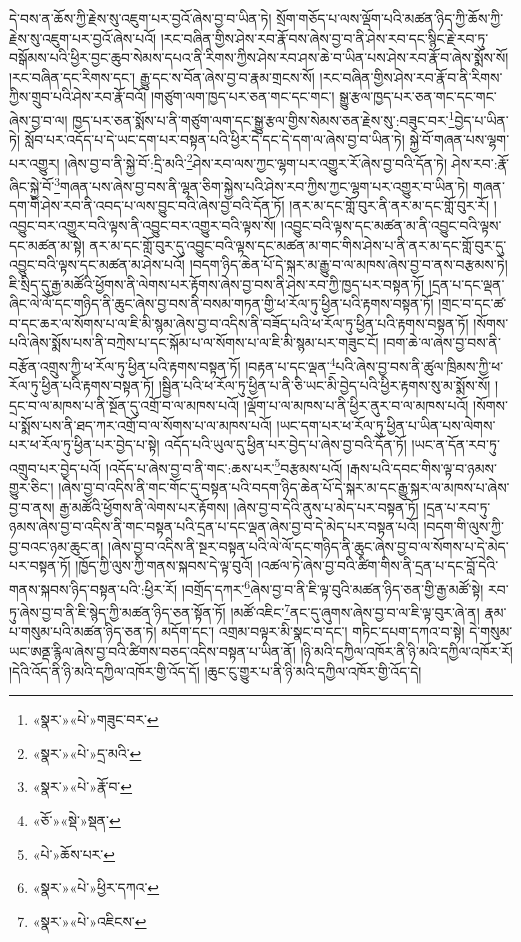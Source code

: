 དེ་བས་ན་ཆོས་ཀྱི་རྗེས་སུ་འཇུག་པར་བྱའོ་ཞེས་བྱ་བ་ཡིན་ཏེ། སྲོག་གཅོད་པ་ལས་ལྡོག་པའི་མཚན་ཉིད་ཀྱི་ཆོས་ཀྱི་རྗེས་སུ་འཇུག་པར་བྱའོ་ཞེས་པའོ། །རང་བཞིན་གྱིས་ཤེས་རབ་རྣོ་བས་ཞེས་བྱ་བ་ནི་ཤེས་རབ་དང་སྙིང་རྗེ་རབ་ཏུ་བསྒོམས་པའི་ཕྱིར་བྱང་ཆུབ་སེམས་དཔའ་ནི་རིགས་ཀྱིས་ཤེས་རབ་ཤས་ཆེ་བ་ཡིན་པས་ཤེས་རབ་རྣོ་བ་ཞེས་སྨོས་སོ། །རང་བཞིན་དང་རིགས་དང་། རྒྱུ་དང་ས་བོན་ཞེས་བྱ་བ་རྣམ་གྲངས་སོ། །རང་བཞིན་གྱིས་ཤེས་རབ་རྣོ་བ་ནི་རིགས་ཀྱིས་གྲུབ་པའི་ཤེས་རབ་རྣོ་བའོ། །གཙུག་ལག་ཁྱད་པར་ཅན་གང་དང་གང་། སྒྱུ་རྩལ་ཁྱད་པར་ཅན་གང་དང་གང་ཞེས་བྱ་བ་ལ། ཁྱད་པར་ཅན་སྨོས་པ་ནི་གཙུག་ལག་དང་སྒྱུ་རྩལ་གྱིས་སེམས་ཅན་རྗེས་སུ་:བཟུང་བར་\footnote{«སྣར་»«པེ་»གཟུང་བར་}བྱེད་པ་ཡིན་ཏེ། སློབ་པར་འདོད་པ་དེ་ཡང་དག་པར་བསྟན་པའི་ཕྱིར་དེ་དང་དེ་དག་ལ་ཞེས་བྱ་བ་ཡིན་ཏེ། སྐྱེ་བོ་གཞན་པས་ལྷག་པར་འགྱུར། །ཞེས་བྱ་བ་ནི་སྐྱེ་བོ་:དྲི་མའི་\footnote{«སྣར་»«པེ་»དྲ་མའི་}ཤེས་རབ་ལས་ཀྱང་ལྷག་པར་འགྱུར་རོ་ཞེས་བྱ་བའི་དོན་ཏེ། ཤེས་རབ་:རྣོ་ཞིང་སྐྱེ་བོ་\footnote{«སྣར་»«པེ་»རྣོ་བ་}གཞན་པས་ཞེས་བྱ་བས་ནི་ལྷན་ཅིག་སྐྱེས་པའི་ཤེས་རབ་ཀྱིས་ཀྱང་ལྷག་པར་འགྱུར་བ་ཡིན་ཏེ། གཞན་དག་གི་ཤེས་རབ་ནི་འབད་པ་ལས་བྱུང་བའི་ཞེས་བྱ་བའི་དོན་ཏོ། །ནར་མ་དང་གློ་བུར་ནི་ནར་མ་དང་གློ་བུར་རོ། །འབྱུང་བར་འགྱུར་བའི་ལྟས་ནི་འབྱུང་བར་འགྱུར་བའི་ལྟས་སོ། །འབྱུང་བའི་ལྟས་དང་མཚན་མ་ནི་འབྱུང་བའི་ལྟས་དང་མཚན་མ་སྟེ། ནར་མ་དང་གློ་བུར་དུ་འབྱུང་བའི་ལྟས་དང་མཚན་མ་གང་གིས་ཤེས་པ་ནི་ནར་མ་དང་གློ་བུར་དུ་འབྱུང་བའི་ལྟས་དང་མཚན་མ་ཤེས་པའོ། །བདག་ཉིད་ཆེན་པོ་དེ་སྐར་མ་རྒྱུ་བ་ལ་མཁས་ཞེས་བྱ་བ་ནས་བརྩམས་ཏེ། ཇི་སྲིད་དུ་རྒྱ་མཚོའི་ཕྱོགས་ནི་ལེགས་པར་རྟོགས་ཞེས་བྱ་བས་ནི་ཤེས་རབ་ཀྱི་ཁྱད་པར་བསྟན་ཏོ། །དྲན་པ་དང་ལྡན་ཞིང་ལེ་ལོ་དང་གཉིད་ནི་ཆུང་ཞེས་བྱ་བས་ནི་བསམ་གཏན་གྱི་ཕ་རོལ་ཏུ་ཕྱིན་པའི་རྟགས་བསྟན་ཏོ། །གྲང་བ་དང་ཚ་བ་དང་ཆར་ལ་སོགས་པ་ལ་ཇི་མི་སྙམ་ཞེས་བྱ་བ་འདིས་ནི་བཟོད་པའི་ཕ་རོལ་ཏུ་ཕྱིན་པའི་རྟགས་བསྟན་ཏོ། །སོགས་པའི་ཞེས་སྨོས་པས་ནི་བཀྲེས་པ་དང་སྐོམ་པ་ལ་སོགས་པ་ལ་ཇི་མི་སྙམ་པར་གཟུང་ངོ། །བག་ཆེ་ལ་ཞེས་བྱ་བས་ནི་བརྩོན་འགྲུས་ཀྱི་ཕ་རོལ་ཏུ་ཕྱིན་པའི་རྟགས་བསྟན་ཏོ། །བརྟན་པ་དང་ལྡན་\footnote{«ཅོ་»«སྡེ་»སྡན་}པའི་ཞེས་བྱ་བས་ནི་ཚུལ་ཁྲིམས་ཀྱི་ཕ་རོལ་ཏུ་ཕྱིན་པའི་རྟགས་བསྟན་ཏོ། །སྦྱིན་པའི་ཕ་རོལ་ཏུ་ཕྱིན་པ་ནི་ཅི་ཡང་མི་བྱེད་པའི་ཕྱིར་རྟགས་སུ་མ་སྨོས་སོ། །དྲང་བ་ལ་མཁས་པ་ནི་སྔོན་དུ་འགྲོ་བ་ལ་མཁས་པའོ། །ལྡོག་པ་ལ་མཁས་པ་ནི་ཕྱིར་ནུར་བ་ལ་མཁས་པའོ། །སོགས་པ་སྨོས་པས་ནི་ཐད་ཀར་འགྲོ་བ་ལ་སོགས་པ་ལ་མཁས་པའོ། །ཡང་དག་པར་ཕ་རོལ་ཏུ་ཕྱིན་པ་ཡིན་པས་ལེགས་པར་ཕ་རོལ་ཏུ་ཕྱིན་པར་བྱེད་པ་སྟེ། འདོད་པའི་ཡུལ་དུ་ཕྱིན་པར་བྱེད་པ་ཞེས་བྱ་བའི་དོན་ཏོ། །ཡང་ན་དོན་རབ་ཏུ་འགྲུབ་པར་བྱེད་པའོ། །འདོད་པ་ཞེས་བྱ་བ་ནི་གང་:ཆས་པར་\footnote{«པེ་»ཆོས་པར་}བརྩམས་པའོ། །རྒས་པའི་དབང་གིས་ལྟ་བ་ཉམས་གྱུར་ཅིང་། །ཞེས་བྱ་བ་འདིས་ནི་གང་གོང་དུ་བསྟན་པའི་བདག་ཉིད་ཆེན་པོ་དེ་སྐར་མ་དང་རྒྱུ་སྐར་ལ་མཁས་པ་ཞེས་བྱ་བ་ནས། རྒྱ་མཚོའི་ཕྱོགས་ནི་ལེགས་པར་རྟོགས། །ཞེས་བྱ་བ་དེའི་ནུས་པ་མེད་པར་བསྟན་ཏོ། །དྲན་པ་རབ་ཏུ་ཉམས་ཞེས་བྱ་བ་འདིས་ནི་གང་བསྟན་པའི་དྲན་པ་དང་ལྡན་ཞེས་བྱ་བ་དེ་མེད་པར་བསྟན་པའོ། །བདག་གི་ལུས་ཀྱི་བྱ་བའང་ཉམ་ཆུང་ན། །ཞེས་བྱ་བ་འདིས་ནི་སྔར་བསྟན་པའི་ལེ་ལོ་དང་གཉིད་ནི་ཆུང་ཞེས་བྱ་བ་ལ་སོགས་པ་དེ་མེད་པར་བསྟན་ཏོ། །ཁྱོད་ཀྱི་ལུས་ཀྱི་གནས་སྐབས་དེ་ལྟ་བུའོ། །འཚལ་ཏེ་ཞེས་བྱ་བའི་ཚིག་གིས་ནི་དྲན་པ་དང་བློ་དེའི་གནས་སྐབས་ཉིད་བསྟན་པའི་:ཕྱིར་རོ། །བགྲོད་དཀར་\footnote{«སྣར་»«པེ་»ཕྱིར་དཀའ་}ཞེས་བྱ་བ་ནི་ཇི་ལྟ་བུའི་མཚན་ཉིད་ཅན་གྱི་རྒྱ་མཚོ་སྟེ། རབ་ཏུ་ཞེས་བྱ་བ་ནི་ཇི་སྙེད་ཀྱི་མཚན་ཉིད་ཅན་སྟོན་ཏོ། །མཚོ་འཇིང་\footnote{«སྣར་»«པེ་»འཇིངས་}ནང་དུ་ཞུགས་ཞེས་བྱ་བ་ལ་ཇི་ལྟ་བུར་ཞེ་ན། རྣམ་པ་གསུམ་པའི་མཚན་ཉིད་ཅན་ཏེ། མདོག་དང་། འགྲམ་བལྟར་མི་སྣང་བ་དང་། གཏིང་དཔག་དཀའ་བ་སྟེ། དེ་གསུམ་ཡང་ཨནྡ་རྙིལ་ཞེས་བྱ་བའི་ཚིགས་བཅད་འདིས་བསྟན་པ་ཡིན་ནོ། །ཉི་མའི་དཀྱིལ་འཁོར་ནི་ཉི་མའི་དཀྱིལ་འཁོར་རོ། །དེའི་འོད་ནི་ཉི་མའི་དཀྱིལ་འཁོར་གྱི་འོད་དོ། །ཆུང་ངུ་གྱུར་པ་ནི་ཉི་མའི་དཀྱིལ་འཁོར་གྱི་འོད་དེ། 